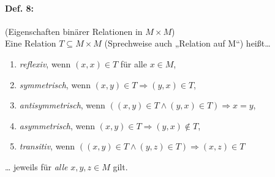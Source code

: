 \paragraph{Def. 8:} (Eigenschaften binärer Relationen in $M\times M$)\\
Eine Relation $T\subseteq M\times M$ (Sprechweise auch „Relation auf M“) heißt…
\begin{enumerate} [label=\alph*)]
\item \emph{reflexiv}, wenn $(x,x) \in T$ für alle $x \in M$,
\item \emph{symmetrisch}, wenn $(x,y) \in T \Rightarrow (y,x) \in T$,
\item \emph{antisymmetrisch}, wenn $((x,y) \in T \wedge (y,x) \in T) \Rightarrow x=y$,
\item \emph{asymmetrisch}, wenn $(x,y) \in T \Rightarrow (y,x) \not\in T$, 
\item \emph{transitiv}, wenn $((x,y) \in T \wedge (y,z) \in T) \Rightarrow (x,z) \in T$
\end{enumerate}
… jeweils für \emph{alle} $x,y,z \in M$ gilt.

